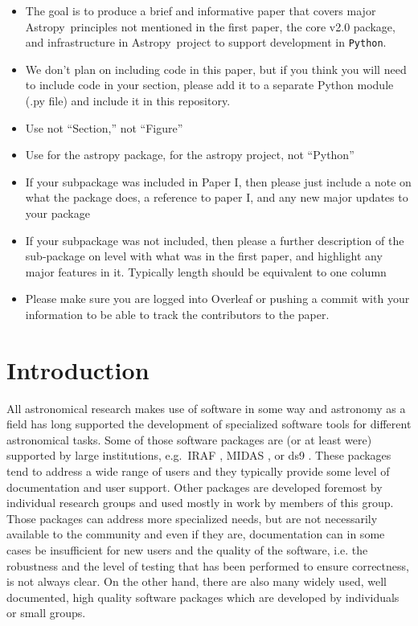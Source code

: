 \documentclass[modern]{aastex61}
\newcommand{\escapecmd}[1]{\texttt{\detokenize{#1}}}
\newcommand{\package}[1]{\texttt{#1}}
\newcommand{\python}{\package{Python}}
\newcommand{\astropy}{Astropy}
\newcommand{\astropypkg}{\package{Astropy}}
\newcommand{\sectionname}{Section}
\renewcommand{\figurename}{Figure}
\begin{document}
\begin{itemize}
   \item The goal is to produce a brief and informative paper that covers major \astropy\ principles not mentioned in the first paper, the core v2.0 package, and infrastructure in \astropy\ project to support development in \python.
	\item We don't plan on including code in this paper, but if you think you will need to include code in your section, please add it to a separate Python module (.py file) and include it in this repository.
    \item Use \escapecmd{\sectionname} not ``Section,'' \escapecmd{\figurename} not ``Figure''
    \item Use \escapecmd{\astropypkg} for the astropy package, \escapecmd{\astropy} for the astropy project, \escapecmd{\python} not ``Python''
    \item If your subpackage was included in Paper I, then please just include a note on what the package does, a reference to paper I, and any new major updates to your package
    \item If your subpackage was not included, then please a further description of the sub-package on level with what was in the first paper, and highlight any major features in it.   Typically length should be equivalent to one column
    \item Please make sure you are logged into Overleaf or pushing a commit with your information to be able to track the contributors to the paper.

\end{itemize}

\section{Introduction} \label{sec:intro}
All astronomical research makes use of software in some way and
astronomy as a field has long supported the development of specialized
software tools for different astronomical tasks. Some of those
software packages are (or at least were) supported by large
institutions, e.g.\ IRAF \citep[developed at NOAO,][]{IRAF}, MIDAS
\citep[developed at ESO,][]{MIDAS}, or ds9 \citep[developed at
%
%
  SAO,][]{ds9}. These packages tend to address a wide range of users
and they typically provide some level of documentation and user
support. Other packages are developed foremost by individual research
groups and used mostly in work by members of this group. Those
packages can address more specialized needs, but are not necessarily
available to the community and even if they are, documentation can in
some cases be insufficient for new users and the quality of the
software, i.e. the robustness and the level of testing that has been
performed to ensure correctness, is not always clear. On the other
hand, there are also many widely used, well documented, high quality
software packages which are developed by individuals or small groups.
\end{document}
